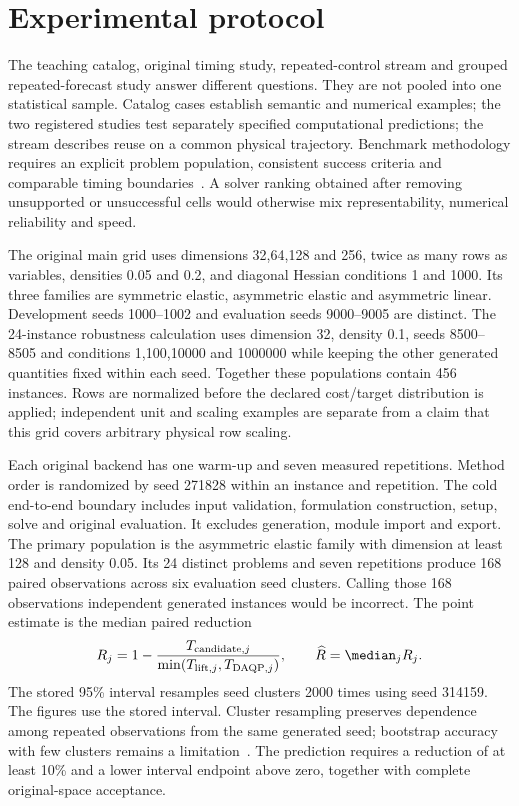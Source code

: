 \section{Experimental protocol}\label{sec:protocol}
The teaching catalog, original timing study, repeated-control stream and
grouped repeated-forecast study answer different questions. They are not
pooled into one statistical sample. Catalog cases establish semantic and
numerical examples; the two registered studies test separately specified
computational predictions; the stream describes reuse on a common physical
trajectory. Benchmark methodology requires an explicit problem population,
consistent success criteria and comparable timing boundaries~\cite{dolan,cutest}.
A solver ranking obtained after removing unsupported or unsuccessful cells
would otherwise mix representability, numerical reliability and speed.

The original main grid uses dimensions 32,64,128 and 256, twice as many rows
as variables, densities 0.05 and 0.2, and diagonal Hessian conditions 1 and 1000.
Its three families are symmetric elastic, asymmetric elastic and asymmetric
linear. Development seeds 1000--1002 and evaluation seeds 9000--9005 are
distinct. The 24-instance robustness calculation uses dimension 32, density 0.1,
seeds 8500--8505 and conditions 1,100,10000 and 1000000 while keeping the
other generated quantities fixed within each seed. Together these populations
contain 456 instances. Rows are normalized before the declared cost/target
distribution is applied; independent unit and scaling examples are separate
from a claim that this grid covers arbitrary physical row scaling.

Each original backend has one warm-up and seven measured repetitions.
Method order is randomized by seed 271828 within an instance
and repetition. The cold end-to-end boundary includes input validation,
formulation construction, setup, solve and original evaluation. It excludes
generation, module import and export. The primary population is the asymmetric
elastic family with dimension at least 128 and density 0.05. Its 24 distinct
problems and seven repetitions produce 168 paired observations across six
evaluation seed clusters. Calling those 168 observations independent generated
instances would be incorrect. The point estimate is the median paired reduction
\begin{equation}\label{eq:original-score}
 R_j=1-\frac{T_{\mathrm{candidate},j}}
 {\min(T_{\mathrm{lift},j},T_{\mathrm{DAQP},j})},\qquad
 \widehat R=\median_j R_j.
\end{equation}
The stored 95\% interval resamples seed clusters 2000 times using seed 314159.
The figures use the stored interval. Cluster resampling preserves
dependence among repeated observations from the same generated seed;
bootstrap accuracy with few clusters remains a limitation~\cite{efron,davison,cameron}.
The prediction requires a reduction of at least 10\% and a lower interval
endpoint above zero, together with complete original-space acceptance.

